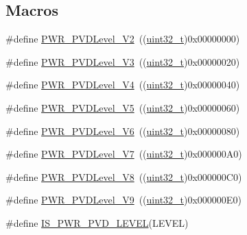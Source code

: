 \subsection*{Macros}
\begin{DoxyCompactItemize}
\item 
\#define \hyperlink{group___p_v_d__detection__level_ga5cf8b09ed099c7412fcee6ccec2ec20b}{P\+W\+R\+\_\+\+P\+V\+D\+Level\+\_\+V2}~((\hyperlink{_p_e___types_8h_a33594304e786b158f3fb30289278f5af}{uint32\+\_\+t})0x00000000)
\item 
\#define \hyperlink{group___p_v_d__detection__level_ga561e543dedb4c2cb126ec8d9d604260c}{P\+W\+R\+\_\+\+P\+V\+D\+Level\+\_\+V3}~((\hyperlink{_p_e___types_8h_a33594304e786b158f3fb30289278f5af}{uint32\+\_\+t})0x00000020)
\item 
\#define \hyperlink{group___p_v_d__detection__level_ga5b585e7e6eda29e8b119e16779ba7a8b}{P\+W\+R\+\_\+\+P\+V\+D\+Level\+\_\+V4}~((\hyperlink{_p_e___types_8h_a33594304e786b158f3fb30289278f5af}{uint32\+\_\+t})0x00000040)
\item 
\#define \hyperlink{group___p_v_d__detection__level_gad91e74c3034a5baccca70250815e680e}{P\+W\+R\+\_\+\+P\+V\+D\+Level\+\_\+V5}~((\hyperlink{_p_e___types_8h_a33594304e786b158f3fb30289278f5af}{uint32\+\_\+t})0x00000060)
\item 
\#define \hyperlink{group___p_v_d__detection__level_ga46174e5288082b59473068a3ca8e8ea6}{P\+W\+R\+\_\+\+P\+V\+D\+Level\+\_\+V6}~((\hyperlink{_p_e___types_8h_a33594304e786b158f3fb30289278f5af}{uint32\+\_\+t})0x00000080)
\item 
\#define \hyperlink{group___p_v_d__detection__level_ga72d22a858d8289ef02fff45f4810b916}{P\+W\+R\+\_\+\+P\+V\+D\+Level\+\_\+V7}~((\hyperlink{_p_e___types_8h_a33594304e786b158f3fb30289278f5af}{uint32\+\_\+t})0x000000\+A0)
\item 
\#define \hyperlink{group___p_v_d__detection__level_ga5f38835a95c026b1db16dbebf81b45a2}{P\+W\+R\+\_\+\+P\+V\+D\+Level\+\_\+V8}~((\hyperlink{_p_e___types_8h_a33594304e786b158f3fb30289278f5af}{uint32\+\_\+t})0x000000\+C0)
\item 
\#define \hyperlink{group___p_v_d__detection__level_ga9c156a7155f9946c0d3a73794f51a1ce}{P\+W\+R\+\_\+\+P\+V\+D\+Level\+\_\+V9}~((\hyperlink{_p_e___types_8h_a33594304e786b158f3fb30289278f5af}{uint32\+\_\+t})0x000000\+E0)
\item 
\#define \hyperlink{group___p_v_d__detection__level_gabac4485a57abc97aad91eaa0b65ae927}{I\+S\+\_\+\+P\+W\+R\+\_\+\+P\+V\+D\+\_\+\+L\+E\+V\+EL}(L\+E\+V\+EL)

\end{DoxyCompactItemize}
